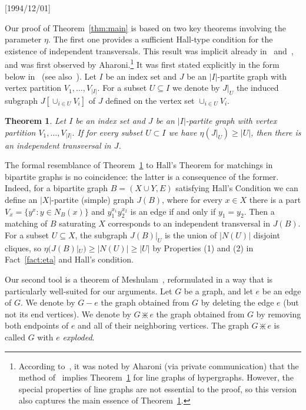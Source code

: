 \NeedsTeXFormat{LaTeX2e}[1994/12/01]\documentclass[letterpaper, 11pt]{article}
\newtheorem{thm}{Theorem}[section]
\theoremstyle{definition}
\theoremstyle{remark}
\numberwithin{equation}{section}
\newcommand{\abs}[1]{\left|#1\right|}
\newcommand{\explode}{\divideontimes}
\begin{document}
Our proof of Theorem~\ref{thm:main} is based on two key theorems
involving the parameter 
$\eta$. The first one provides a sufficient Hall-type condition for the
existence of independent transversals. This result was
implicit already in~\cite{aharonihaxell} and~\cite{meshulam1}, and was
first observed by Aharoni.\footnote{
According to~\cite{meshulam1}, it was
noted by Aharoni (via private communication) that the method
of~\cite{aharonihaxell} implies
Theorem~\ref{thm:aharoniberger} for line graphs  
of hypergraphs. However, the special properties of line graphs are not
essential to the proof, so this version also captures the main essence
of Theorem~\ref{thm:aharoniberger}.}
It was first stated explicitly in the   
form below in~\cite{meshulam2} (see also~\cite{aharoniberger}). 
Let $I$ be an index set and $J$ be an $|I|$-partite graph with
vertex partition $V_1, \ldots , V_{|I|}$. For a subset $U\subseteq I$
we denote by $J|_U$ the induced subgraph 
$J[\cup_{i\in U}V_i]$ of $J$ defined on the vertex set $\cup_{i\in U} V_i$. 
\begin{thm}\label{thm:aharoniberger}
Let $I$ be an index set and $J$ be an $|I|$-partite graph with
vertex partition $V_1, \ldots , V_{|I|}$. If for every subset $U\subset I$ we have
$\eta\left(J|_U\right) \geq \abs{U}$, then there is an
independent transversal in $J$.
\end{thm}
The formal resemblance of Theorem~\ref{thm:aharoniberger} to Hall's Theorem for
matchings in bipartite graphs is no coincidence: the latter is a
consequence of the former.
Indeed, for a bipartite graph $B = (X\cup Y, E)$ satisfying
Hall's Condition we can define an $|X|$-partite (simple) graph $J(B)$,
where for every $x\in X$ there is a part $V_x = \{ y^x : y\in N_B(x) \}$ and
$y_1^{x_1}y_2^{x_2}$ is an edge if and only if $y_1=y_2$. Then a matching
of $B$ saturating $X$ corresponds to an independent transversal in
$J(B)$.
For a subset $U\subseteq X$, the subgraph $J(B)|_U$ is the union of
$|N(U)|$ disjoint cliques, so $\eta(J(B)|_U) \geq |N(U)| \geq |U|$ by
Properties (1) and (2) in Fact~\ref{fact:eta} and Hall's condition.   

Our second tool is a theorem of Meshulam~\cite{meshulam2}, reformulated
in a way that is particularly well-suited for our
arguments. Let $G$ be a graph, and let $e$ be an edge of $G$.
We denote by $G - e$ the graph obtained from $G$
by deleting the edge $e$ (but not its end vertices).
We denote by $G \explode e$ the graph obtained from $G$ by removing
both endpoints of $e$ and all of their neighboring vertices.
The graph $G \explode e$ is called $G$ with $e$ \emph{exploded}.
\end{document}
